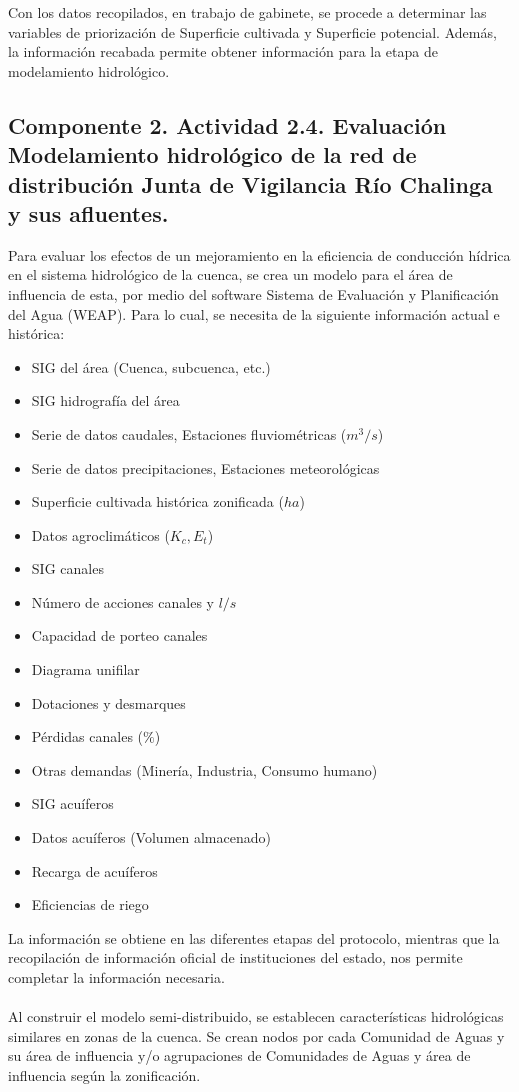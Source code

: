 \documentclass[]{article}
\begin{document}
Con los datos recopilados, en trabajo de gabinete, se procede a determinar las variables de priorización de Superficie cultivada y Superficie potencial. Además, la información recabada permite obtener información para la etapa de modelamiento hidrológico.
\clearpage
\subsection{Componente 2. Actividad 2.4. Evaluación Modelamiento hidrológico de la red de distribución Junta de Vigilancia Río Chalinga y sus afluentes.}

Para evaluar los efectos de un mejoramiento en la eficiencia de conducción hídrica en el sistema hidrológico de la cuenca, se crea un modelo para el área de influencia de esta, por medio del software Sistema de Evaluación y Planificación del Agua (WEAP). Para lo cual, se necesita de la siguiente información actual e histórica:

\begin{itemize}	
	\item SIG del área (Cuenca, subcuenca, etc.)
	\item SIG hidrografía del área
	\item Serie de datos caudales, Estaciones fluviométricas ($m^3/s$)
	\item Serie de datos precipitaciones, Estaciones meteorológicas 
	\item Superficie cultivada histórica zonificada ($ha$)
	\item Datos agroclimáticos ($K_c, E_t$)
	\item SIG canales
	\item Número de acciones canales y $l/s$
	\item Capacidad de porteo canales
	\item Diagrama unifilar
	\item Dotaciones y desmarques
	\item Pérdidas canales ($\%$)
	\item Otras demandas (Minería, Industria, Consumo humano)
	\item SIG acuíferos
	\item Datos acuíferos (Volumen almacenado)
	\item Recarga de acuíferos
	\item Eficiencias de riego
\end{itemize}

La información se obtiene en las diferentes etapas del protocolo, mientras que la recopilación de información oficial de instituciones del estado, nos permite completar la información necesaria. \\
\\
Al construir el modelo semi-distribuido, se establecen características hidrológicas similares en zonas de la cuenca. Se crean nodos por cada Comunidad de Aguas y su área de influencia y/o agrupaciones de Comunidades de Aguas y área de influencia según la zonificación.
\end{document}
